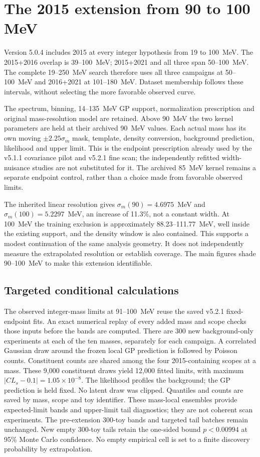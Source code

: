 \section{The 2015 extension from 90 to 100 MeV}
\label{app:v504-extension}
Version 5.0.4 includes 2015 at every integer hypothesis from 19 to 100~MeV.
The 2015+2016 overlap is 39--100~MeV; 2015+2021 and all three span
50--100~MeV. The complete 19--250~MeV search therefore uses all three
campaigns at 50--100~MeV and 2016+2021 at 101--180~MeV. Dataset membership
follows these intervals, without selecting the more favorable observed curve.

The spectrum, binning, 14--135~MeV GP support, normalization prescription
and original mass-resolution model are retained. Above 90~MeV the two
kernel parameters are held at their archived 90~MeV values. Each actual
mass has its own moving $\pm2.25\sigma_m$ mask, template, density conversion,
background prediction, likelihood and upper limit. This is the endpoint
prescription already used by the v5.1.1 covariance pilot and v5.2.1 fine scan;
the independently refitted width-nuisance studies are not substituted for it.
The archived 85~MeV kernel remains a separate endpoint control, rather than a
choice made from favorable observed limits.

The inherited linear resolution gives $\sigma_m(90)=4.6975$~MeV and
$\sigma_m(100)=5.2297$~MeV, an increase of 11.3\%, not a constant width.
At 100~MeV the training exclusion is approximately 88.23--111.77~MeV,
well inside the existing support, and the density window is also contained.
This supports a modest continuation of the same analysis geometry. It does
not independently measure the extrapolated resolution or establish coverage.
The main figures shade 90--100~MeV to make this extension identifiable.

\subsection{Targeted conditional calculations}
The observed integer-mass limits at 91--100~MeV reuse the saved v5.2.1
fixed-endpoint fits. An exact numerical replay of every added mass and scope
checks those inputs before the bands are computed. There are 300 new
background-only experiments at each of the ten masses, separately for each
campaign. A correlated Gaussian draw around the frozen local GP prediction
is followed by Poisson counts. Constituent counts are shared among the four
2015-containing scopes at a mass. These 9,000 constituent draws yield
12,000 fitted limits, with maximum $|CL_s-0.1|=1.05\times10^{-8}$.
The likelihood profiles the background; the GP prediction is held fixed.
No latent draw was clipped. Quantiles and counts are saved by mass, scope
and toy identifier. These mass-local ensembles provide expected-limit bands
and upper-limit tail diagnostics; they are not coherent scan experiments.
The pre-extension 300-toy bands and targeted tail batches remain unchanged.
New empty 300-toy tails retain the one-sided bound $p<0.00994$ at 95\%
Monte Carlo confidence. No empty empirical cell is set to a finite discovery
probability by extrapolation.

